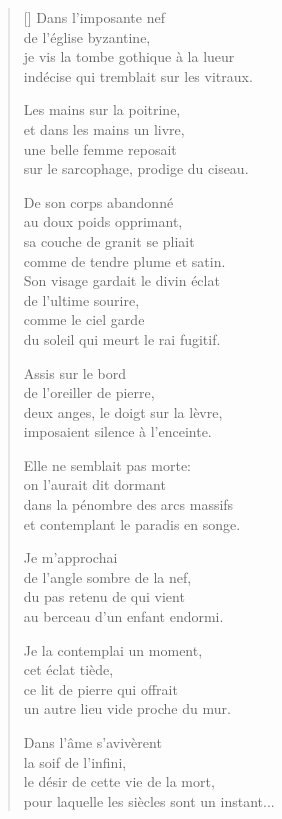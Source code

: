 \documentclass[a4paper,12pt]{book}
\begin{document}
\begin{verse}[\versewidth]
  Dans l'imposante nef \\
  de l'église byzantine, \\
  je vis la tombe gothique à la lueur \\
  indécise qui tremblait sur les vitraux.

  Les mains sur la poitrine, \\
  et dans les mains un livre, \\
  une belle femme reposait \\
  sur le sarcophage, prodige du ciseau.

  De son corps abandonné \\
  au doux poids opprimant, \\
  sa couche de granit se pliait \\
  comme de tendre plume et satin. \\

  Son visage gardait le divin éclat \\
  de l'ultime sourire, \\
  comme le ciel garde \\
  du soleil qui meurt le rai fugitif.

  Assis sur le bord \\
  de l'oreiller de pierre, \\
  deux anges, le doigt sur la lèvre, \\
  imposaient silence à l'enceinte.

  Elle ne semblait pas morte: \\
  on l'aurait dit dormant \\
  dans la pénombre des arcs massifs \\
  et contemplant le paradis en songe.

  Je m'approchai \\
  de l'angle sombre de la nef, \\
  du pas retenu de qui vient \\
  au berceau d'un enfant endormi.

  Je la contemplai un moment, \\
  cet éclat tiède, \\
  ce lit de pierre qui offrait \\
  un autre lieu vide proche du mur.

  Dans l'âme s'avivèrent \\
  la soif de l'infini, \\
  le désir de cette vie de la mort, \\
  pour laquelle les siècles sont un instant...


\end{verse}
\end{document}
